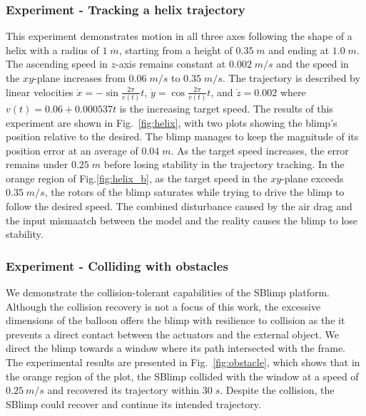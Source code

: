 \documentclass[conference]{ieeeconf}
\newcommand{\fixme}[1]{{\color{red}FIXME: #1}}
\begin{document}
\subsubsection{Experiment - Tracking a helix trajectory}
This experiment demonstrates motion in all three axes following the shape of a helix with a radius of $1\; m$, starting from a height of $0.35\; m$ and ending at $1.0\; m$. The ascending speed in $z$-axis remains constant at $0.002\; m/s$ and the speed in the $xy$-plane increases from $0.06\; m/s$ to $0.35\; m/s$. The trajectory is described by linear velocities $\dot x = -\sin{\frac{2\pi}{v(t)}t}$, $\dot y = \cos{\frac{2\pi}{v(t)}t}$, and $\dot z = 0.002$ where $v(t) = 0.06 + 0.000537t$ is the increasing target speed.
The results of this experiment are shown in Fig.~\ref{fig:helix}, with two plots showing the blimp's position relative to the desired. The blimp manages to keep the magnitude of its position error at an average of $0.04\; m$. As the target speed increases, the error remains under $0.25\; m$ before losing stability in the trajectory tracking. In the orange region of Fig.\ref{fig:helix_b}, as the target speed in the $xy$-plane exceeds $0.35\; m/s$, the rotors of the blimp saturates while trying to drive the blimp to follow the desired speed. The combined disturbance caused by the air drag and the input mismaatch between the model and the reality causes the blimp to lose stability.

\subsubsection{Experiment - Colliding with obstacles}

We demonstrate the collision-tolerant capabilities of the SBlimp platform. Although the collision recovery is not a focus of this work, the excessive dimensions of the balloon offers the blimp with resilience to collision as the it prevents a direct contact between the actuators and the external object. We direct the blimp towards a window where its path intersected with the frame. The experimental results are presented in Fig.~\ref{fig:obstacle}, which shows that in the orange region of the plot, the SBlimp collided with the window at a speed of $0.25 \ m/s$ and recovered its trajectory within $30\; s$. Despite the collision, the SBlimp could recover and continue its intended trajectory.
\end{document}
